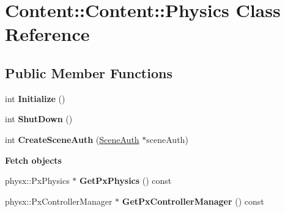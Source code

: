 \hypertarget{classContent_1_1Content_1_1Physics}{
\section{Content::Content::Physics Class Reference}
\label{classContent_1_1Content_1_1Physics}
}
\subsection*{Public Member Functions}
\begin{DoxyCompactItemize}
\item 
\hypertarget{classContent_1_1Content_1_1Physics_a8ed68346dd1665d958802e2a6d21d429}{
int {\bfseries Initialize} ()}
\label{classContent_1_1Content_1_1Physics_a8ed68346dd1665d958802e2a6d21d429}

\item 
\hypertarget{classContent_1_1Content_1_1Physics_a9cd32443eadadcd2ce038f12fbb5f336}{
int {\bfseries ShutDown} ()}
\label{classContent_1_1Content_1_1Physics_a9cd32443eadadcd2ce038f12fbb5f336}

\item 
\hypertarget{classContent_1_1Content_1_1Physics_ac633d8b4da17b8838646840f4c4a0d95}{
int {\bfseries CreateSceneAuth} (\hyperlink{classContent_1_1SceneAuth}{SceneAuth} $\ast$sceneAuth)}
\label{classContent_1_1Content_1_1Physics_ac633d8b4da17b8838646840f4c4a0d95}

\end{DoxyCompactItemize}
\begin{Indent}{\bf Fetch objects}\par
{\em \label{_amgrp3c854b4b8917696ee3112e6c72a3b2ad}
 }\begin{DoxyCompactItemize}
\item 
\hypertarget{classContent_1_1Content_1_1Physics_a06387132ad511b22340ba0af61638e9a}{
physx::PxPhysics $\ast$ {\bfseries GetPxPhysics} () const }
\label{classContent_1_1Content_1_1Physics_a06387132ad511b22340ba0af61638e9a}

\item 
\hypertarget{classContent_1_1Content_1_1Physics_a2930ac819c1a1e11f7becf6f260cdc6a}{
physx::PxControllerManager $\ast$ {\bfseries GetPxControllerManager} () const }
\label{classContent_1_1Content_1_1Physics_a2930ac819c1a1e11f7becf6f260cdc6a}

\end{DoxyCompactItemize}
\end{Indent}
